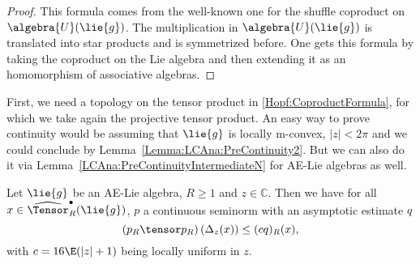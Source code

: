 \begin{proof}
    This formula comes from the well-known one for the shuffle coproduct
    on $\algebra{U}(\lie{g})$. The multiplication in $\algebra{U}
    (\lie{g})$ is translated into star products and is symmetrized
    before. One gets this formula by taking the coproduct on the Lie
    algebra and then extending it as an homomorphism of associative
    algebras.
\end{proof}

%


First, we need a topology on the tensor product in
\eqref{Hopf:CoproductFormula}, for which we take again the projective
tensor product. An easy way to prove continuity would be assuming that 
$\lie{g}$ is locally m-convex, $|z|< 2\pi$ and we could conclude by 
Lemma~\ref{Lemma:LCAna:PreContinuity2}. But we can also do it via 
Lemma~\ref{LCAna:PreContinuityIntermediateN} for AE-Lie algebras as
well.
\begin{proposition}
    \label{Prop:Hopf:CoproductContinuity}%
    Let $\lie{g}$ be an AE-Lie algebra, $R \geq 1$ and $z \in
    \mathbb{C}$. Then we have for all $x \in 
    \widehat{\Tensor}_R^\bullet(\lie{g})$, 
    $p$ a continuous seminorm with an asymptotic estimate $q$
    \begin{equation}
        \label{Hopf:CoproductContinuity}
        (p_R \tensor p_R)
        \left(\ocoproduct_z(x)\right)
        \leq
        (c q)_R (x),
    \end{equation}
    with $c = 16 \E (|z| + 1)$ being locally uniform in $z$.
\end{proposition}
